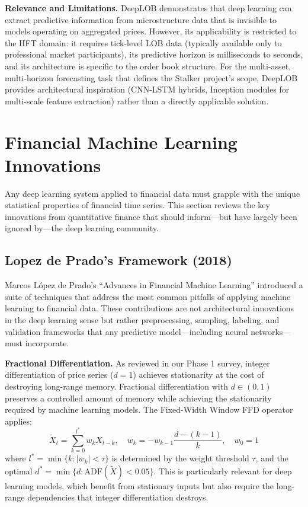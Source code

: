 \documentclass[conference]{IEEEtran}
\begin{document}
\textbf{Relevance and Limitations.} DeepLOB demonstrates that deep learning can extract predictive information from microstructure data that is invisible to models operating on aggregated prices. However, its applicability is restricted to the HFT domain: it requires tick-level LOB data (typically available only to professional market participants), its predictive horizon is milliseconds to seconds, and its architecture is specific to the order book structure. For the multi-asset, multi-horizon forecasting task that defines the Stalker project's scope, DeepLOB provides architectural inspiration (CNN-LSTM hybrids, Inception modules for multi-scale feature extraction) rather than a directly applicable solution.

\section{Financial Machine Learning Innovations}
\label{sec:finml}

Any deep learning system applied to financial data must grapple with the unique statistical properties of financial time series. This section reviews the key innovations from quantitative finance that should inform---but have largely been ignored by---the deep learning community.

\subsection{Lopez de Prado's Framework (2018)}

Marcos L\'{o}pez de Prado's ``Advances in Financial Machine Learning'' \cite{lopez2018advances} introduced a suite of techniques that address the most common pitfalls of applying machine learning to financial data. These contributions are not architectural innovations in the deep learning sense but rather preprocessing, sampling, labeling, and validation frameworks that any predictive model---including neural networks---must incorporate.

\textbf{Fractional Differentiation.} As reviewed in our Phase 1 survey, integer differentiation of price series ($d = 1$) achieves stationarity at the cost of destroying long-range memory. Fractional differentiation with $d \in (0, 1)$ preserves a controlled amount of memory while achieving the stationarity required by machine learning models. The Fixed-Width Window FFD operator applies:
\begin{equation}
\tilde{X}_t = \sum_{k=0}^{l^*} w_k X_{t-k}, \quad w_k = -w_{k-1}\frac{d - (k-1)}{k}, \quad w_0 = 1
\end{equation}
where $l^* = \min\{k : |w_k| < \tau\}$ is determined by the weight threshold $\tau$, and the optimal $d^* = \min\{d : \text{ADF}(\tilde{X}) < 0.05\}$. This is particularly relevant for deep learning models, which benefit from stationary inputs but also require the long-range dependencies that integer differentiation destroys.
\end{document}
